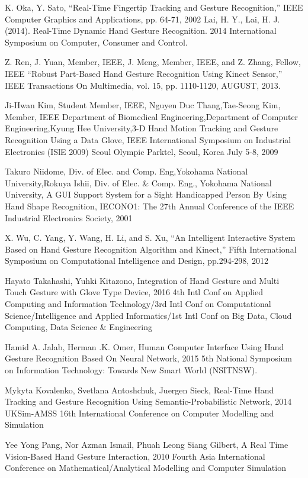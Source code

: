 \documentclass[11pt]{report}
\begin{document}
\begin{thebibliography}{999}

    \bibitem{} K. Oka, Y. Sato, “Real-Time Fingertip Tracking and Gesture Recognition,” IEEE Computer Graphics and Applications, pp. 64-71, 2002
    \bibitem{} Lai, H. Y., Lai, H. J. (2014). Real-Time Dynamic Hand Gesture Recognition. 2014 International Symposium on Computer, Consumer and Control. 
    
    \bibitem{} Z. Ren, J. Yuan, Member, IEEE, J. Meng, Member, IEEE, and Z. Zhang, Fellow, IEEE “Robust Part-Based Hand Gesture Recognition Using Kinect Sensor,” IEEE Transactions On Multimedia, vol. 15, pp. 1110-1120, AUGUST, 2013.
    
    \bibitem{} Ji-Hwan Kim, Student Member, IEEE, Nguyen Duc Thang,Tae-Seong Kim, Member, IEEE Department of Biomedical Engineering,Department of Computer Engineering,Kyung Hee University,3-D Hand Motion Tracking and Gesture Recognition
    Using a Data Glove, IEEE International Symposium on Industrial Electronics (ISlE 2009) Seoul Olympic Parktel, Seoul, Korea July 5-8, 2009
    
    \bibitem{} Takuro Niidome, Div. of Elec. and Comp. Eng,Yokohama National University,Rokuya Ishii, Div. of Elec. \& Comp. Eng., Yokohama National University, A GUI Support System for a Sight Handicapped Person By Using Hand Shape Recognition, IECONO1: The 27th Annual Conference of the IEEE Industrial Electronics Society, 2001
    
    \bibitem{} X. Wu, C. Yang, Y. Wang, H. Li, and S. Xu, “An Intelligent Interactive System Based on Hand Gesture Recognition Algorithm and Kinect,” Fifth International Symposium on Computational Intelligence and Design, pp.294-298, 2012
    
    \bibitem{} Hayato Takahashi, Yuhki Kitazono, Integration of Hand Gesture and Multi Touch Gesture with Glove Type Device, 2016 4th Intl Conf on Applied Computing and Information Technology/3rd Intl Conf on Computational Science/Intelligence and Applied Informatics/1st Intl Conf on Big Data, Cloud Computing, Data Science \& Engineering
    
    \bibitem{} Hamid A. Jalab, Herman .K. Omer, Human Computer Interface Using Hand Gesture Recognition Based On Neural Network, 2015 5th National Symposium on Information Technology: Towards New Smart World (NSITNSW).
    
    \bibitem{} Mykyta Kovalenko, Svetlana Antoshchuk, Juergen Sieck, Real-Time Hand Tracking and Gesture Recognition Using Semantic-Probabilistic Network, 2014 UKSim-AMSS 16th International Conference on Computer Modelling and Simulation
    
    \bibitem{} Yee Yong Pang, Nor Azman Ismail, Phuah Leong Siang Gilbert, A Real Time Vision-Based Hand Gesture Interaction, 2010 Fourth Asia International Conference on Mathematical/Analytical Modelling and Computer Simulation
    



\end{thebibliography}
\end{document}
